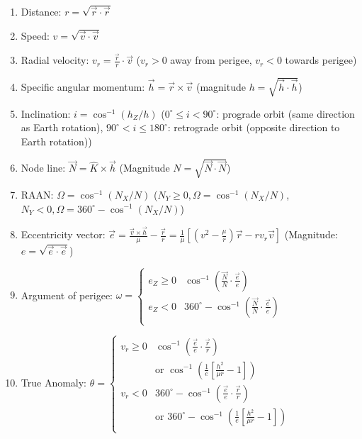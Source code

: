 \documentclass[letterpaper, 8pt]{extarticle}
\begin{document}
\begin{multicols*}{5}
\begin{enumerate}
    \item Distance: $r = \sqrt{\vec{r} \cdot \vec{r}}$
    \item Speed: $v = \sqrt{\vec{v} \cdot \vec{v}}$
    \item Radial velocity: $v_r = \frac{\vec{r}}{r} \cdot \vec{v}$
          ($v_r > 0$ away from perigee, $v_r < 0$ towards perigee)
    \item Specific angular momentum: $\vec{h} = \vec{r} \times \vec{v}$
          (magnitude $h = \sqrt{\vec{h} \cdot \vec{h}}$)
    \item Inclination: $i = \cos^{-1} (h_Z / h)$
        ($0^\circ \leq i < 90^\circ$: prograde orbit (same direction as Earth rotation),
        $90^\circ < i \leq 180^\circ$: retrograde orbit (opposite direction to Earth rotation))
    \item Node line: $\vec{N} = \hat{K} \times \vec{h}$
        (Magnitude $N = \sqrt{\vec{N} \cdot \vec{N}}$)
    \item RAAN: $\Omega = \cos^{-1} (N_X / N)$
        ($N_Y \geq 0, \Omega = \cos^{-1} (N_X / N)$,
        $N_Y < 0, \Omega = 360^\circ - \cos^{-1}(N_X / N)$)
    \item Eccentricity vector: $\vec{e} 
        = \frac{\vec{v} \times \vec{h}}{\mu} - \frac{\vec{r}}{r}
        = \frac{1}{\mu} \left[\left(v^2 - \frac{\mu}{r}\right) \vec{r} - r v_r \vec{v}\right]$
        (Magnitude: $e = \sqrt{\vec{e} \cdot \vec{e}}$)
    \item Argument of perigee: $\omega = 
    \begin{cases}
        e_Z \geq 0 & \cos^{-1} \left(\frac{\vec{N}}{N} \cdot \frac{\vec{e}}{e}\right) \\
        e_Z < 0 & 360^\circ - \cos^{-1} \left(\frac{\vec{N}}{N} \cdot \frac{\vec{e}}{e}\right) \\
    \end{cases}$
    \item True Anomaly: $\theta =
    \begin{cases}
        v_r \geq 0 & \cos^{-1} \left(\frac{\vec{e}}{e} \cdot \frac{\vec{r}}{r}\right) \\
                   & \text{or } \cos^{-1} \left(\frac{1}{e} \left[\frac{h^2}{\mu r} - 1\right]\right) \\
        v_r < 0    & 360^\circ - \cos^{-1} \left(\frac{\vec{e}}{e} \cdot \frac{\vec{r}}{r}\right) \\
                   & \text{or } 360^\circ - \cos^{-1} \left(\frac{1}{e} \left[\frac{h^2}{\mu r} - 1\right]\right) \\
    \end{cases}$
\end{enumerate}


\end{multicols*}
\end{document}
